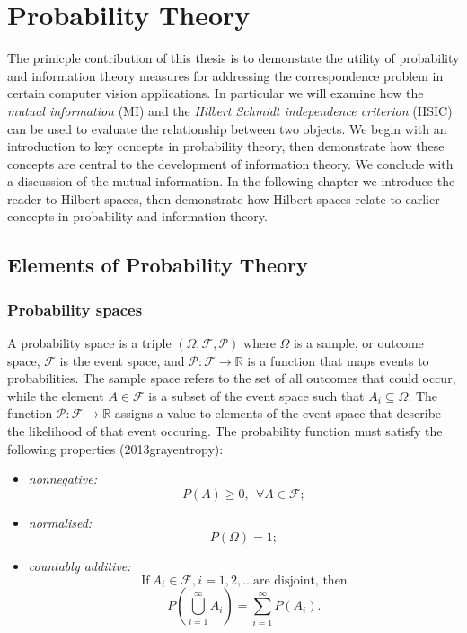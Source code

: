 \chapter{Probability Theory}
\label{probability}


The prinicple contribution of this thesis is to demonstate the utility of probability and information theory measures for addressing the correspondence problem in certain computer vision applications. In particular we will examine how the \textit{mutual information} (MI) and the \textit{Hilbert Schmidt independence criterion} (HSIC) can be used to evaluate the relationship between two objects. We begin with an introduction to key concepts in probability theory, then demonstrate how these concepts are central to the development of information theory. We conclude with a discussion of the mutual information. In the following chapter we introduce the reader to Hilbert spaces, then demonstrate how Hilbert spaces relate to earlier concepts in probability and information theory. 

\section{Elements of Probability Theory}

\subsection{Probability spaces}

A probability space is a triple $(\Omega, \mathcal{F}, \mathcal{P})$ where $\Omega$ is a sample, or outcome space, $\mathcal{F}$ is the event space, and $\mathcal{P} : \mathcal{F} \rightarrow \mathbb{R}$ is a function that maps events to probabilities. The sample space refers to the set of all outcomes that could occur, while the element $A \in \mathcal{F}$ is a subset of the event space such that $A_i \subseteq \Omega$. The function $\mathcal{P} : \mathcal{F} \rightarrow \mathbb{R}$ assigns a value to elements of the event space that describe the likelihood of that event occuring. The probability function must satisfy the following properties (2013grayentropy):

\begin{itemize}
	\item \textit{nonnegative:} 
		\begin{equation}
			P(A) \geq 0, \:\: \forall A \in \mathcal{F};
		\end{equation}
	\item \textit{normalised:} 
		\begin{equation}
			P(\Omega) = 1;
		\end{equation}
	\item \textit{countably additive:} 
		$$\text{If} \: A_i \in \mathcal{F}, i = 1, 2, ... \text{are disjoint, then}$$
		\begin{equation}
			P(\bigcup_{i=1}^{\infty} A_i) = \sum_{i=1}^{\infty}{P(A_i)}.
		\end{equation}
\end{itemize}


